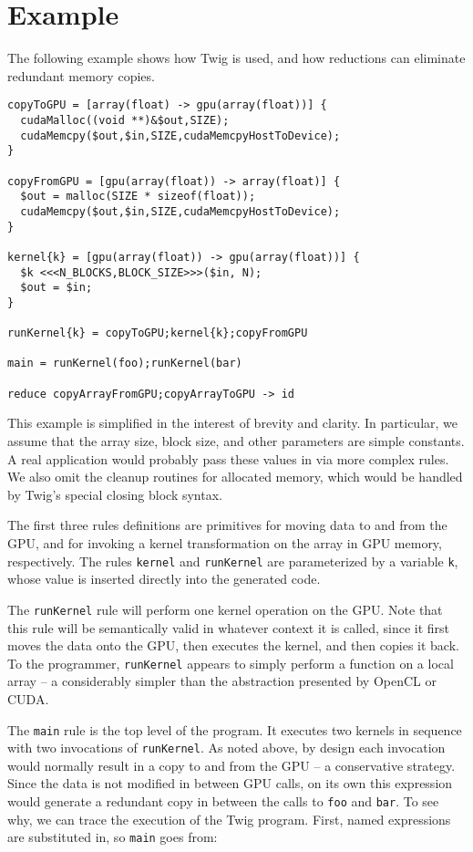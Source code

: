 
\section{Example}

The following example shows how Twig is used, and how reductions can eliminate
redundant memory copies.

\begin{verbatim}
copyToGPU = [array(float) -> gpu(array(float))] {
  cudaMalloc((void **)&$out,SIZE);
  cudaMemcpy($out,$in,SIZE,cudaMemcpyHostToDevice);
}

copyFromGPU = [gpu(array(float)) -> array(float)] {
  $out = malloc(SIZE * sizeof(float));
  cudaMemcpy($out,$in,SIZE,cudaMemcpyHostToDevice);
}

kernel{k} = [gpu(array(float)) -> gpu(array(float))] {
  $k <<<N_BLOCKS,BLOCK_SIZE>>>($in, N);
  $out = $in;
}

runKernel{k} = copyToGPU;kernel{k};copyFromGPU

main = runKernel(foo);runKernel(bar)

reduce copyArrayFromGPU;copyArrayToGPU -> id
\end{verbatim}

This example is simplified in the interest of brevity and clarity. In
particular, we assume that the array size, block size, and other parameters are
simple constants. A real application would probably pass these values in via
more complex rules. We also omit the cleanup routines for allocated memory,
which would be handled by Twig's special closing block syntax.

The first three rules definitions are primitives for moving data to and from the
GPU, and for invoking a kernel transformation on the array in GPU memory,
respectively. The rules \texttt{kernel} and \texttt{runKernel} are parameterized
by a variable \texttt{k}, whose value is inserted directly into the generated
code.

The \texttt{runKernel} rule will perform one kernel operation on the GPU. Note
that this rule will be semantically valid in whatever context it is called,
since it first moves the data onto the GPU, then executes the kernel, and then
copies it back. To the programmer, \texttt{runKernel} appears to simply perform
a function on a local array -- a considerably simpler than the abstraction
presented by OpenCL or CUDA.

The \texttt{main} rule is the top level of the program. It executes two kernels
in sequence with two invocations of \texttt{runKernel}. As noted above, by
design each invocation would normally result in a copy to and from the GPU -- a
conservative strategy. Since the data is not modified in between GPU calls, on
its own this expression would generate a redundant copy in between the calls to
\texttt{foo} and \texttt{bar}. To see why, we can trace the execution of the
Twig program. First, named expressions are substituted in, so \texttt{main}
goes from:

